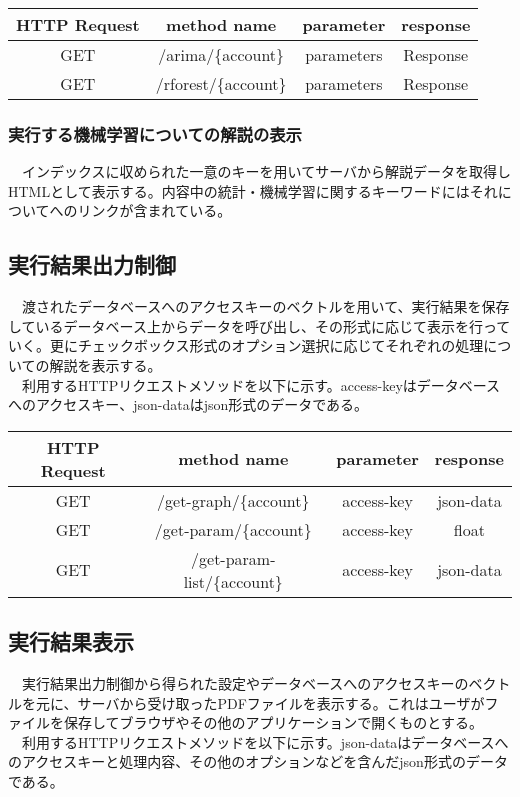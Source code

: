 \documentclass{scrartcl}
\begin{document}
\begin{enumerate}
\begin{center}
\begin{tabular}{|c|c|c|c|}
\hline
HTTP Request & method name & parameter & response\\
\hline
GET & /arima/\{account\} & parameters & Response\\
GET & /rforest/\{account\} & parameters & Response\\
\hline
\end{tabular}
\end{center}
\end{enumerate}
\subsubsection{実行する機械学習についての解説の表示}
\label{sec:org77223f9}
　インデックスに収められた一意のキーを用いてサーバから解説データを取得しHTMLとして表示する。内容中の統計・機械学習に関するキーワードにはそれについてへのリンクが含まれている。\\
\subsection{実行結果出力制御}
\label{sec:org0b84128}
　渡されたデータベースへのアクセスキーのベクトルを用いて、実行結果を保存しているデータベース上からデータを呼び出し、その形式に応じて表示を行っていく。更にチェックボックス形式のオプション選択に応じてそれぞれの処理についての解説を表示する。\\
　利用するHTTPリクエストメソッドを以下に示す。access-keyはデータベースへのアクセスキー、json-dataはjson形式のデータである。\\

\begin{center}
\begin{tabular}{|c|c|c|c|}
\hline
HTTP Request & method name & parameter & response\\
\hline
GET & /get-graph/\{account\} & access-key & json-data\\
GET & /get-param/\{account\} & access-key & float\\
GET & /get-param-list/\{account\} & access-key & json-data\\
\hline
\end{tabular}
\end{center}
\subsection{実行結果表示}
\label{sec:org5ffd10b}
　実行結果出力制御から得られた設定やデータベースへのアクセスキーのベクトルを元に、サーバから受け取ったPDFファイルを表示する。これはユーザがファイルを保存してブラウザやその他のアプリケーションで開くものとする。\\
　利用するHTTPリクエストメソッドを以下に示す。json-dataはデータベースへのアクセスキーと処理内容、その他のオプションなどを含んだjson形式のデータである。\\
\end{document}
